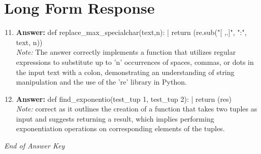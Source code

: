 \documentclass[12pt]{article}
\begin{document}
\section*{Long Form Response}
\begin{enumerate}[label=\arabic*.]
\setcounter{enumi}{10}
\item \textbf{Answer:} def replace\_max\_specialchar(text,n): | return (re.sub("[ ,.]", ":", text, n))
\\ \textit{Note:} The answer correctly implements a function that utilizes regular expressions to substitute up to 'n' occurrences of spaces, commas, or dots in the input text with a colon, demonstrating an understanding of string manipulation and the use of the 're' library in Python.
\item \textbf{Answer:} def find\_exponentio(test\_tup 1, test\_tup 2): | return (res)
\\ \textit{Note:} correct as it outlines the creation of a function that takes two tuples as input and suggests returning a result, which implies performing exponentiation operations on corresponding elements of the tuples.
\end{enumerate}

\vfill
\noindent\textit{End of Answer Key}
\end{document}
